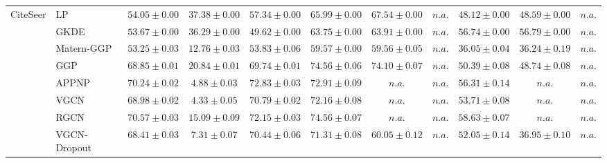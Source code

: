 \begin{table*}[!h]
{\begin{tabular}{ll|cc|cccc|ccc}
        \midrule
        
        \multirow{14}{*}{CiteSeer} 
        & LP & ${54.05\scriptscriptstyle \pm 0.00}$ & ${37.38\scriptscriptstyle \pm 0.00}$ & ${57.34\scriptscriptstyle \pm 0.00}$ & ${65.99\scriptscriptstyle \pm 0.00}$ & ${67.54\scriptscriptstyle \pm 0.00}$ & $n.a.$ & ${48.12\scriptscriptstyle \pm 0.00}$ & ${48.59\scriptscriptstyle \pm 0.00}$ & $n.a.$\\
        & GKDE & ${53.67\scriptscriptstyle \pm 0.00}$ & ${36.29\scriptscriptstyle \pm 0.00}$ & ${49.62\scriptscriptstyle \pm 0.00}$ & ${63.75\scriptscriptstyle \pm 0.00}$ & ${63.91\scriptscriptstyle \pm 0.00}$ & $n.a.$ & ${56.74\scriptscriptstyle \pm 0.00}$ & ${56.79\scriptscriptstyle \pm 0.00}$ & $n.a.$\\
        & Matern-GGP & ${53.25\scriptscriptstyle \pm 0.03}$ & ${12.76\scriptscriptstyle \pm 0.03}$ & ${53.83\scriptscriptstyle \pm 0.06}$ & ${59.57\scriptscriptstyle \pm 0.00}$ & ${59.56\scriptscriptstyle \pm 0.05}$ & $n.a.$ & ${36.05\scriptscriptstyle \pm 0.04}$ & ${36.24\scriptscriptstyle \pm 0.19}$ & $n.a.$\\
        & GGP & ${68.85\scriptscriptstyle \pm 0.01}$ & ${20.84\scriptscriptstyle \pm 0.01}$ & ${69.74\scriptscriptstyle \pm 0.01}$ & ${\mathbf{74.56}\scriptscriptstyle \pm 0.06}$ & ${74.10\scriptscriptstyle \pm 0.07}$ & $n.a.$ & ${50.39\scriptscriptstyle \pm 0.08}$ & ${48.74\scriptscriptstyle \pm 0.08}$ & $n.a.$\\
        & APPNP & ${70.24\scriptscriptstyle \pm 0.02}$ & ${4.88\scriptscriptstyle \pm 0.03}$ & ${{72.83}\scriptscriptstyle \pm 0.03}$ & ${72.91\scriptscriptstyle \pm 0.09}$ & $n.a.$ & $n.a.$ & ${56.31\scriptscriptstyle \pm 0.14}$ & $n.a.$ & $n.a.$\\
        & VGCN & ${68.98\scriptscriptstyle \pm 0.02}$ & ${4.33\scriptscriptstyle \pm 0.05}$ & ${70.79\scriptscriptstyle \pm 0.02}$ & ${72.16\scriptscriptstyle \pm 0.08}$ & $n.a.$ & $n.a.$ & ${53.71\scriptscriptstyle \pm 0.08}$ & $n.a.$ & $n.a.$\\
        & RGCN & ${\mathbf{70.57}\scriptscriptstyle \pm 0.03}$ & ${15.09\scriptscriptstyle \pm 0.09}$ & ${72.15\scriptscriptstyle \pm 0.03}$ & ${74.56\scriptscriptstyle \pm 0.07}$ & $n.a.$ & $n.a.$ & ${\mathbf{58.63}\scriptscriptstyle \pm 0.07}$ & $n.a.$ & $n.a.$\\
        & VGCN-Dropout & ${68.41\scriptscriptstyle \pm 0.03}$ & ${7.31\scriptscriptstyle \pm 0.07}$ & ${70.44\scriptscriptstyle \pm 0.06}$ & ${71.31\scriptscriptstyle \pm 0.08}$ & ${60.05\scriptscriptstyle \pm 0.12}$ & $n.a.$ & ${52.05\scriptscriptstyle \pm 0.14}$ & ${36.95\scriptscriptstyle \pm 0.10}$ & $n.a.$\\

\end{tabular}}
\end{table*}
